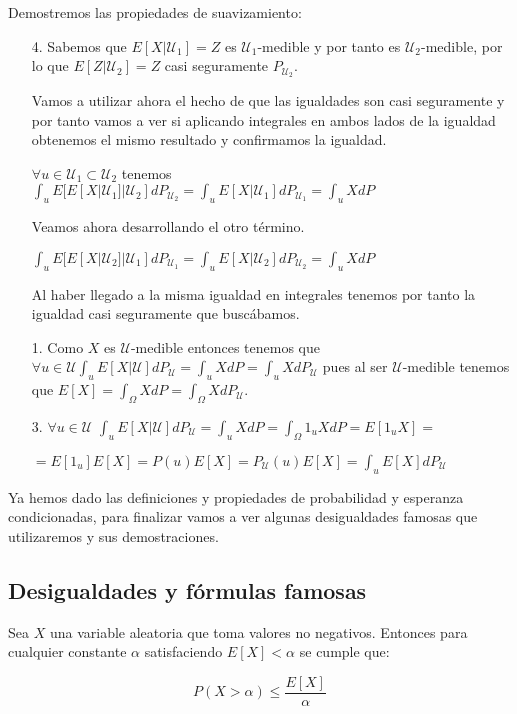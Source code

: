 \begin{demostracion}
	Demostremos las propiedades de suavizamiento:
	\begin{enumerate}
		\item[4.] Sabemos que $E[X | \mathcal{U}_1] = Z$ es $\mathcal{U}_1$-medible y por tanto es $\mathcal{U}_2$-medible, por lo que $E[Z | \mathcal{U}_2] = Z$ casi seguramente $P_{\mathcal{U}_2}$.
		
		Vamos a utilizar ahora el hecho de que las igualdades son casi seguramente y por tanto vamos a ver si aplicando integrales en ambos lados de la igualdad obtenemos el mismo resultado y confirmamos la igualdad.
		
		$\forall u\in \mathcal{U}_1 \subset \mathcal{U}_2$ tenemos $\int_{u} E[E[X | \mathcal{U}_1] | \mathcal{U}_2]dP_{\mathcal{U}_2} = \int_{u}E[X | \mathcal{U}_1]dP_{\mathcal{U}_1} = \int_{u}XdP$
		
		Veamos ahora desarrollando el otro término.
		
		$\int_{u} E[E[X | \mathcal{U}_2] | \mathcal{U}_1]dP_{\mathcal{U}_1} = \int_{u}E[X | \mathcal{U}_2] dP_{\mathcal{U}_2} = \int_{u}XdP$
		
		Al haber llegado a la misma igualdad en integrales tenemos por tanto la igualdad casi seguramente que buscábamos.
		\item[1.] Como $X$ es $\mathcal{U}$-medible entonces tenemos que $\forall u \in \mathcal{U} \int_{u}E[X | \mathcal{U}] dP_{\mathcal{U}} = \int_{u}XdP = \int_{u}XdP_{\mathcal{U}}$ pues al ser $\mathcal{U}$-medible tenemos que $E[X] = \int_{\Omega} XdP = \int_{\Omega}XdP_{\mathcal{U}}$.
		\item[3.] $\forall u \in \mathcal{U}$ $\int_{u}E[X | \mathcal{U}]dP_{\mathcal{U}} = \int_{u} XdP = \int_{\Omega}1_{u}XdP = E[1_u X] = $
		
		$= E[1_u]E[X] = P(u)E[X] = P_{\mathcal{U}}(u)E[X] = \int_{u}E[X]dP_{\mathcal{U}}$
	\end{enumerate}
\end{demostracion}

Ya hemos dado las definiciones y propiedades de probabilidad y esperanza condicionadas, para finalizar vamos a ver algunas desigualdades famosas que utilizaremos y sus demostraciones.

\subsection{Desigualdades y fórmulas famosas}

\begin{teorema}
	Sea $X$ una variable aleatoria que toma valores no negativos. Entonces para cualquier constante $\alpha$ satisfaciendo $E[X]<\alpha$ se cumple que:
	
	$$P(X>\alpha) \leq \frac{E[X]}{\alpha}$$
\end{teorema}

